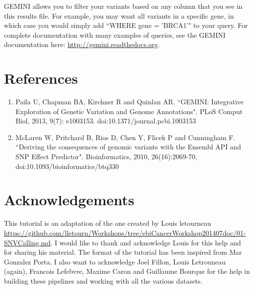 GEMINI allows you to filter your variants based on any column that you see in this results file. For example, you may want all variants in a specific gene, in which case you would simply add ``WHERE gene = 'BRCA1'" to your query. For complete documentation with many examples of queries, see the GEMINI documentation here: \url{http://gemini.readthedocs.org}.


\newpage


\section{References}

\begin{enumerate}
  \item Paila U, Chapman BA, Kirchner R and Quinlan AR. ``GEMINI: Integrative Exploration of Genetic Variation and Genome Annotations". PLoS Comput Biol, 2013, 9(7): e1003153. doi:10.1371/journal.pcbi.1003153
  \item McLaren W, Pritchard B, Rios D, Chen Y, Flicek P and Cunningham F. ``Deriving the consequences of genomic variants with the Ensembl API and SNP Effect Predictor". Bioinformatics, 2010, 26(16):2069-70, doi:10.1093/bioinformatics/btq330
\end{enumerate}

\section{Acknowledgements}
This tutorial is an adaptation of the one created by Louis letourneau \url{https://github.com/lletourn/Workshops/tree/ebiCancerWorkshop201407doc/01-SNVCalling.md}. I would like to thank and acknowledge Louis for this help and for sharing his material. The format of the tutorial has been inspired from Mar Gonzalez Porta. I also want to acknowledge Joel Fillon, Louis Letrouneau (again), Francois Lefebvre, Maxime Caron and Guillaume Bourque for the help in building these pipelines and working with all the various datasets.
